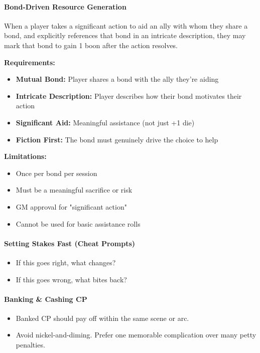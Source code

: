 \documentclass[11pt]{article}
\begin{document}
\paragraph{Bond-Driven Resource Generation}
When a player takes a significant action to aid an ally with whom they share a bond, and explicitly references that bond in an intricate description, they may mark that bond to gain 1 boon after the action resolves.

\textbf{Requirements:}
\begin{itemize}
    \item \textbf{Mutual Bond:} Player shares a bond with the ally they're aiding
    \item \textbf{Intricate Description:} Player describes how their bond motivates their action
    \item \textbf{Significant Aid:} Meaningful assistance (not just +1 die)
    \item \textbf{Fiction First:} The bond must genuinely drive the choice to help
\end{itemize}

\textbf{Limitations:}
\begin{itemize}
    \item Once per bond per session
    \item Must be a meaningful sacrifice or risk
    \item GM approval for "significant action"
    \item Cannot be used for basic assistance rolls
\end{itemize}

\paragraph{Setting Stakes Fast (Cheat Prompts)}
\begin{itemize}
    \item If this goes right, what changes?
    \item If this goes wrong, what bites back?
\end{itemize}

\paragraph{Banking \& Cashing CP}
\begin{itemize}
    \item Banked CP should pay off within the same scene or arc.
    \item Avoid nickel-and-diming. Prefer one memorable complication over many petty penalties.
\end{itemize}
\end{document}
